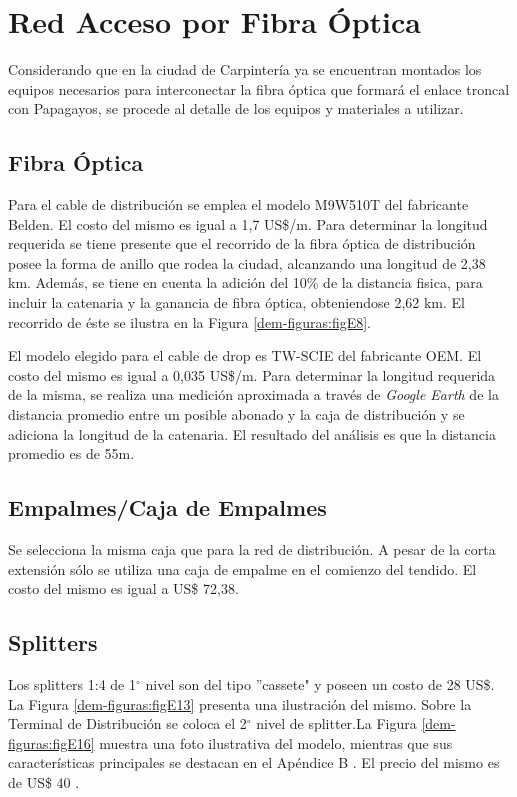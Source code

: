 \section{Red Acceso por Fibra Óptica}
Considerando que en la ciudad de Carpintería ya se encuentran montados los equipos necesarios para interconectar la fibra óptica que formará el enlace troncal con Papagayos, se procede al detalle de los equipos y materiales a utilizar.
\subsection{Fibra Óptica}
Para el cable de distribución se emplea el modelo M9W510T del fabricante Belden. El costo del mismo es igual a 1,7 US\$/m.
Para determinar la longitud requerida se tiene presente que el recorrido de la fibra óptica de distribución posee la forma de anillo que rodea la ciudad, alcanzando una longitud de 2,38 km. Además, se tiene en cuenta la adición del 10\% de la distancia fisica, para incluir la catenaria y la ganancia de fibra óptica, obteniendose 2,62 km.
El recorrido de éste se ilustra en la Figura \ref{dem-figuras:figE8}.

El modelo elegido para el cable de drop es TW-SCIE del fabricante OEM.  El costo del mismo es igual a 0,035 US\$/m. Para determinar la longitud requerida de la misma, se realiza una medición aproximada a través de \textit{Google Earth} de la distancia promedio entre un posible abonado y la caja de distribución y se adiciona la longitud de la catenaria. El resultado del análisis es que la distancia promedio es de 55m.

\subsection{Empalmes/Caja de Empalmes}
Se selecciona la misma caja que para la red de distribución. A pesar de la corta extensión sólo se utiliza una caja de empalme en el comienzo del tendido. El costo del mismo es igual a US\$ 72,38.
\subsection{Splitters}
Los splitters 1:4 de 1$^{\circ}$ nivel son del tipo ''cassete" y poseen un  costo de 28 US\$. La Figura \ref{dem-figuras:figE13} presenta una ilustración del mismo.
Sobre la Terminal de Distribución se coloca el 2$^{\circ}$ nivel de splitter.La Figura \ref{dem-figuras:figE16} muestra una foto ilustrativa del modelo, mientras que sus características principales se destacan en el Apéndice B \cite{apendice-b}. El precio del mismo es de US\$ 40 \cite{terminal-fat}.

